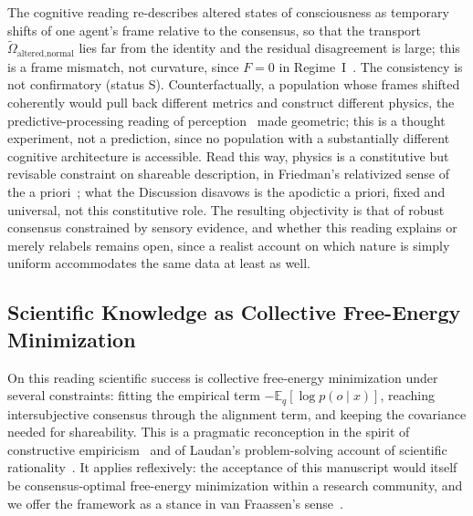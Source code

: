 The cognitive reading re-describes altered states of consciousness as temporary shifts of one agent's frame relative to the consensus, so that the transport $\tilde{\Omega}_{\text{altered,normal}}$ lies far from the identity and the residual disagreement is large; this is a frame mismatch, not curvature, since $F = 0$ in Regime~I~\cite{Carhart-Harris2014, Swanson2018, CarhartHarrisFriston2019}. The consistency is not confirmatory (status S). Counterfactually, a population whose frames shifted coherently would pull back different metrics and construct different physics, the predictive-processing reading of perception~\cite{Clark2016, Seth2021, Hoffman2019, hohwy2013predictive} made geometric; this is a thought experiment, not a prediction, since no population with a substantially different cognitive architecture is accessible. Read this way, physics is a constitutive but revisable constraint on shareable description, in Friedman's relativized sense of the a priori~\cite{Friedman2001}; what the Discussion disavows is the apodictic a priori, fixed and universal, not this constitutive role. The resulting objectivity is that of robust consensus constrained by sensory evidence, and whether this reading explains or merely relabels remains open, since a realist account on which nature is simply uniform accommodates the same data at least as well.

\subsection{Scientific Knowledge as Collective Free-Energy Minimization}

On this reading scientific success is collective free-energy minimization under several constraints: fitting the empirical term $-\mathbb{E}_q[\log p(o \mid x)]$, reaching intersubjective consensus through the alignment term, and keeping the covariance needed for shareability. This is a pragmatic reconception in the spirit of constructive empiricism~\cite{vanFraassen1980} and of Laudan's problem-solving account of scientific rationality~\cite{Laudan1977}. It applies reflexively: the acceptance of this manuscript would itself be consensus-optimal free-energy minimization within a research community, and we offer the framework as a stance in van Fraassen's sense~\cite{vanFraassen2002}.

